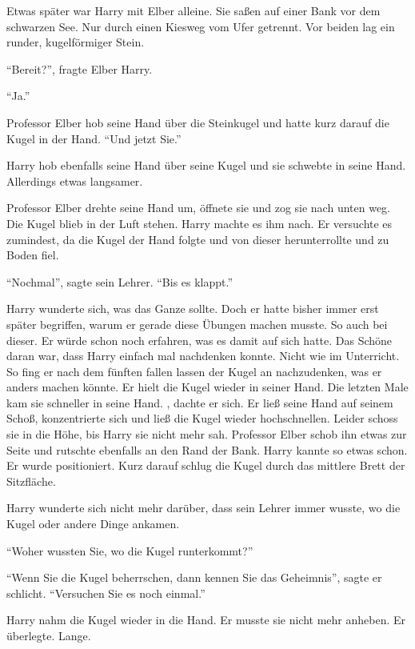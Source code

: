Etwas später war Harry mit Elber alleine. Sie saßen auf einer Bank vor dem schwarzen See. Nur durch einen Kiesweg vom Ufer getrennt. Vor beiden lag ein runder, kugelförmiger Stein.

\enquote{Bereit?}, fragte Elber Harry.

\enquote{Ja.}

Professor Elber hob seine Hand über die Steinkugel und hatte kurz darauf die Kugel in der Hand. \enquote{Und jetzt Sie.}

Harry hob ebenfalls seine Hand über seine Kugel und sie schwebte in seine Hand. Allerdings etwas langsamer.

Professor Elber drehte seine Hand um, öffnete sie und zog sie nach unten weg. Die Kugel blieb in der Luft stehen. Harry machte es ihm nach. Er versuchte es zumindest, da die Kugel der Hand folgte und von dieser herunterrollte und zu Boden fiel.

\enquote{Nochmal}, sagte sein Lehrer. \enquote{Bis es klappt.}

Harry wunderte sich, was das Ganze sollte. Doch er hatte bisher immer erst später begriffen, warum er gerade diese Übungen machen musste. So auch bei dieser. Er würde schon noch erfahren, was es damit auf sich hatte. Das Schöne daran war, dass Harry einfach mal nachdenken konnte. Nicht wie im Unterricht. So fing er nach dem fünften fallen lassen der Kugel an nachzudenken, was er anders machen könnte. Er hielt die Kugel wieder in seiner Hand. Die letzten Male kam sie schneller in seine Hand. , dachte er sich.  Er ließ seine Hand auf seinem Schoß, konzentrierte sich und ließ die Kugel wieder hochschnellen. Leider schoss sie in die Höhe, bis Harry sie nicht mehr sah. Professor Elber schob ihn etwas zur Seite und rutschte ebenfalls an den Rand der Bank. Harry kannte so etwas schon. Er wurde positioniert. Kurz darauf schlug die Kugel durch das mittlere Brett der Sitzfläche.

Harry wunderte sich nicht mehr darüber, dass sein Lehrer immer wusste, wo die Kugel oder andere Dinge ankamen.

\enquote{Woher wussten Sie, wo die Kugel runterkommt?}

\enquote{Wenn Sie die Kugel beherrschen, dann kennen Sie das Geheimnis}, sagte er schlicht. \enquote{Versuchen Sie es noch einmal.}

Harry nahm die Kugel wieder in die Hand. Er musste sie nicht mehr anheben. Er überlegte. Lange.

